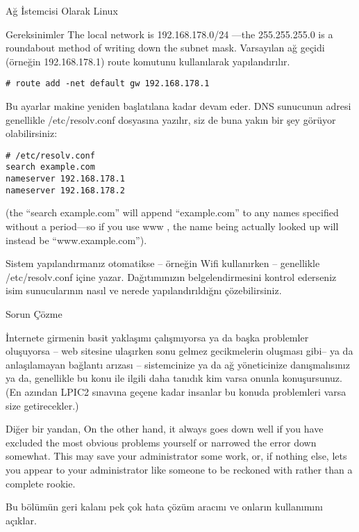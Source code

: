 \begin{section}{Ağ İstemcisi Olarak Linux}
\begin{subsection}{Gereksinimler}
The local network is 192.168.178.0/24 —the 255.255.255.0 is a roundabout method of  writing down the subnet mask. Varsayılan ağ geçidi (örneğin 192.168.178.1) route komutunu kullanılarak yapılandırılır.

\begin{verbatim}
# route add -net default gw 192.168.178.1
\end{verbatim}

Bu ayarlar makine yeniden başlatılana kadar devam eder. DNS sunucunun adresi genellikle /etc/resolv.conf dosyasına yazılır, siz de buna yakın bir şey görüyor olabilirsiniz:
\begin{verbatim}
# /etc/resolv.conf
search example.com
nameserver 192.168.178.1
nameserver 192.168.178.2
\end{verbatim}

(the “search example.com” will append “example.com” to any names specified without a period—so if you use www , the name being actually looked up will instead be “www.example.com”).

Sistem yapılandırmanız otomatikse -- örneğin Wifi kullanırken -- genellikle /etc/resolv.conf içine yazar. Dağıtımınızın belgelendirmesini kontrol ederseniz isim sunucularının nasıl ve nerede yapılandırıldığnı çözebilirsiniz. 

\end{subsection}
\begin{subsection}{Sorun Çözme}

İnternete girmenin basit yaklaşımı çalışmıyorsa ya da başka problemler oluşuyorsa -- web sitesine ulaşırken sonu gelmez gecikmelerin oluşması gibi-- ya da anlaşılamayan bağlantı arızası -- sistemcinize ya da ağ yöneticinize danışmalısınız ya da, genellikle bu konu ile ilgili daha tanıdık kim varsa onunla konuşursunuz. (En azından LPIC2 sınavına geçene kadar insanlar bu konuda problemleri varsa size getirecekler.) 

Diğer bir yandan, On the other hand, it always goes down well if you have excluded the most obvious problems yourself or narrowed the error down somewhat. This may save your administrator some work, or, if nothing else, lets you appear to your administrator like someone to be reckoned with rather than a complete rookie.

Bu bölümün geri kalanı pek çok hata çözüm aracını ve onların kullanımını açıklar. 


\end{subsection}
\end{section}
